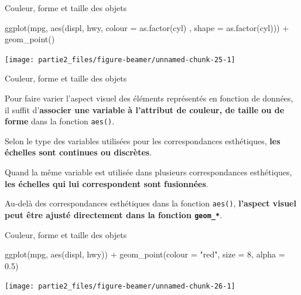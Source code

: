 \documentclass[12pt,ignorenonframetext,]{beamer}
\newenvironment{Shaded}{}{}
\newcommand{\DataTypeTok}[1]{#1}
\newcommand{\DecValTok}[1]{#1}
\newcommand{\FloatTok}[1]{#1}
\newcommand{\KeywordTok}[1]{\textcolor[rgb]{0.00,0.00,1.00}{#1}}
\newcommand{\NormalTok}[1]{#1}
\newcommand{\OperatorTok}[1]{#1}
\newcommand{\StringTok}[1]{\textcolor[rgb]{0.00,0.50,0.50}{#1}}
\renewenvironment{Shaded}{\begin{snugshade}}{\end{snugshade}}
\begin{document}
\begin{frame}[fragile]{Couleur, forme et taille des objets}
\protect\hypertarget{couleur-forme-et-taille-des-objets-8}{}

\footnotesize \center

\begin{Shaded}
\begin{Highlighting}[]
\KeywordTok{ggplot}\NormalTok{(mpg, }\KeywordTok{aes}\NormalTok{(displ, hwy, }\DataTypeTok{colour =} \KeywordTok{as.factor}\NormalTok{(cyl)}
\NormalTok{  , }\DataTypeTok{shape =} \KeywordTok{as.factor}\NormalTok{(cyl))) }\OperatorTok{+}
\StringTok{  }\KeywordTok{geom_point}\NormalTok{()}
\end{Highlighting}
\end{Shaded}

\texttt{[image: partie2\_files/figure-beamer/unnamed-chunk-25-1]}

\end{frame}

\begin{frame}{Couleur, forme et taille des objets}
\protect\hypertarget{couleur-forme-et-taille-des-objets-9}{}

Pour faire varier l’aspect visuel des éléments représentés en fonction
de données, il suffit
d’\textbf{associer une variable à l'attribut de couleur, de taille ou de forme}
dans la fonction \texttt{aes()}.

Selon le type des variables utilisées pour les correspondances
esthétiques, \textbf{les échelles sont continues ou discrètes}.

Quand la même variable est utilisée dans plusieurs correspondances
esthétiques,
\textbf{les échelles qui lui correspondent sont fusionnées}.

Au-delà des correspondances esthétiques dans la fonction \texttt{aes()},
\textbf{l'aspect visuel peut être ajusté directement dans la fonction \texttt{geom\_*}}.

\end{frame}

\begin{frame}[fragile]{Couleur, forme et taille des objets}
\protect\hypertarget{couleur-forme-et-taille-des-objets-10}{}

\footnotesize \center

\begin{Shaded}
\begin{Highlighting}[]
\KeywordTok{ggplot}\NormalTok{(mpg, }\KeywordTok{aes}\NormalTok{(displ, hwy)) }\OperatorTok{+}
\StringTok{  }\KeywordTok{geom_point}\NormalTok{(}\DataTypeTok{colour =} \StringTok{"red"}\NormalTok{, }\DataTypeTok{size =} \DecValTok{8}\NormalTok{, }\DataTypeTok{alpha =} \FloatTok{0.5}\NormalTok{)}
\end{Highlighting}
\end{Shaded}

\texttt{[image: partie2\_files/figure-beamer/unnamed-chunk-26-1]}

\end{frame}
\end{document}
